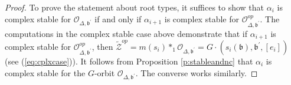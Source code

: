 \documentclass[12pt]{amsart}
\numberwithin{equation}{section}
\newcommand{\cZ}{{\mathcal Z}}
\newcommand{\fb}{\mbox{${\mathfrak b}$}}
\newcommand{\C}{\mbox{${\mathbb C}$}}
\newcommand{\B}{\mathcal{B}}
\begin{document}
\begin{proof}
To prove the statement about root types, it suffices to show that 
$\alpha_{i}$ is complex stable for $\mathcal{O}_{\Delta, \fb^{\prime}}$ if and only if $\alpha_{i+1}$ is complex stable for $\mathcal{O}_{\Delta, \fb^{\prime}}^{op}$.  The computations in the complex stable case above demonstrate that if $\alpha_{i+1}$ is complex stable for $\mathcal{O}_{\Delta, \fb^{\prime}}^{op}$, then $\tilde{\cZ}^{op}=m(s_{i})*_{1}\mathcal{O}_{\Delta,\fb^{\prime}}=G\cdot (s_{i}(\fb), \fb^{\prime},[e_{i}])$ (see (\ref{eq:cplxcase})).  It follows from Proposition \ref{p:stableandnc} that $\alpha_{i}$ is complex stable for the $G$-orbit $\mathcal{O}_{\Delta,\fb^{\prime}}$.  The converse works similarly. 

\end{proof}



\end{document}
